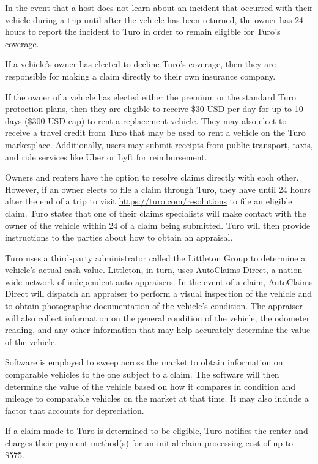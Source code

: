 \documentclass[preprint,12pt]{elsarticle}
\begin{document}
In the event that a host does not learn about an incident that occurred with their vehicle during a trip until after the vehicle has been returned, the owner has 24 hours to report the incident to Turo in order to remain eligible for Turo's coverage.

If a vehicle's owner has elected to decline Turo's coverage, then they are responsible for making a claim directly to their own insurance company.

If the owner of a vehicle has elected either the premium or the standard Turo protection plans, then they are eligible to receive \$30 USD per day for up to 10 days (\$300 USD cap) to rent a replacement vehicle. They may also elect to receive a travel credit from Turo that may be used to rent a vehicle on the Turo marketplace. Additionally, users may submit receipts from public transport, taxis, and ride services like Uber or Lyft for reimbursement.

Owners and renters have the option to resolve claims directly with each other. However, if an owner elects to file a claim through Turo, they have until 24 hours after the end of a trip to visit \url{https://turo.com/resolutions} to file an eligible claim. Turo states that one of their claims specialists will make contact with the owner of the vehicle within 24 of a claim being submitted. Turo will then provide instructions to the parties about how to obtain an appraisal.

Turo uses a third-party administrator called the Littleton Group to determine a vehicle's actual cash value. Littleton, in turn, uses AutoClaims Direct, a nation-wide network of independent auto appraisers. In the event of a claim, AutoClaims Direct will dispatch an appraiser to perform a visual inspection of the vehicle and to obtain photographic documentation of the vehicle's condition. The appraiser will also collect information on the general condition of the vehicle, the odometer reading, and any other information that may help accurately determine the value of the vehicle.

Software is employed to sweep across the market to obtain information on comparable vehicles to the one subject to a claim. The software will then determine the value of the vehicle based on how it compares in condition and mileage to comparable vehicles on the market at that time. It may also include a factor that accounts for depreciation.

If a claim made to Turo is determined to be eligible, Turo notifies the renter and charges their payment method(s) for an initial claim processing cost of up to \$575.
\end{document}
